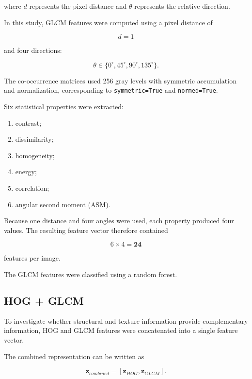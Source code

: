 \documentclass[11pt,a4paper]{article}
\begin{document}
where $d$ represents the pixel distance and $\theta$ represents the relative direction.

In this study, GLCM features were computed using a pixel distance of

\begin{equation}
d=1
\end{equation}

and four directions:

\begin{equation}
\theta \in
\{0^\circ,45^\circ,90^\circ,135^\circ\}.
\end{equation}

The co-occurrence matrices used 256 gray levels with symmetric accumulation and normalization, corresponding to \texttt{symmetric=True} and \texttt{normed=True}.

Six statistical properties were extracted:

\begin{enumerate}
    \item contrast;
    \item dissimilarity;
    \item homogeneity;
    \item energy;
    \item correlation;
    \item angular second moment (ASM).
\end{enumerate}

Because one distance and four angles were used, each property produced four values. The resulting feature vector therefore contained

\begin{equation}
6 \times 4 =
\mathbf{24}
\end{equation}

features per image.

The GLCM features were classified using a random forest.

\subsection{HOG + GLCM}

To investigate whether structural and texture information provide complementary information, HOG and GLCM features were concatenated into a single feature vector.

The combined representation can be written as

\begin{equation}
\mathbf{z}_{combined}
=
[\mathbf{z}_{HOG}, \mathbf{z}_{GLCM}].
\end{equation}
\end{document}
